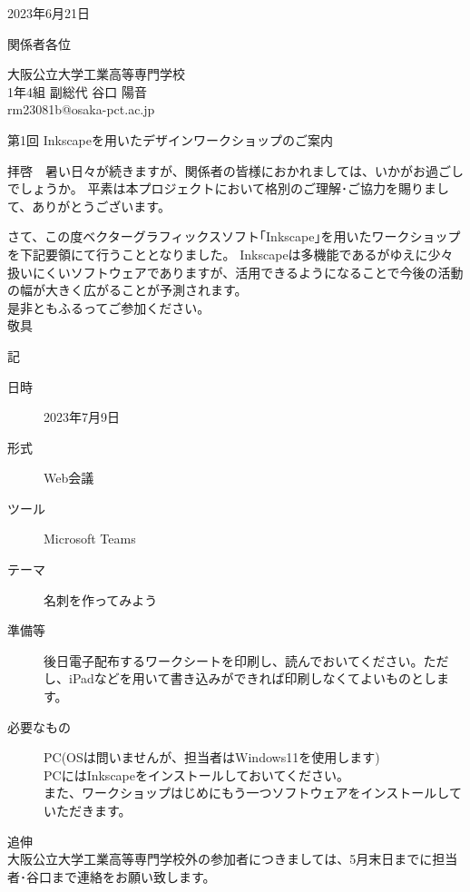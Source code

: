 \documentclass[12pt]{ltjsarticle}
\begin{document}
\begin{flushright}
  2023年6月21日
\end{flushright}

\begin{flushleft}
  関係者各位
\end{flushleft}

\begin{flushright}
  大阪公立大学工業高等専門学校\\
  1年4組 副総代 谷口 陽音\\
  rm23081b@osaka-pct.ac.jp
\end{flushright}

\begin{center}
  \Large 第1回  Inkscapeを用いたデザインワークショップのご案内
\end{center}

拝啓　暑い日々が続きますが、関係者の皆様におかれましては、いかがお過ごしでしょうか。
平素は本プロジェクトにおいて格別のご理解･ご協力を賜りまして、ありがとうございます。


さて、この度ベクターグラフィックスソフト｢Inkscape｣を用いたワークショップを下記要領にて行うこととなりました。
Inkscapeは多機能であるがゆえに少々扱いにくいソフトウェアでありますが、活用できるようになることで今後の活動の幅が大きく広がることが予測されます。\\
是非ともふるってご参加ください。\\
敬具

\begin{center}
  記
\end{center}

\begin{description}
  \item[日時] 2023年7月9日
  \item[形式] Web会議
  \item[ツール] Microsoft Teams
  \item[テーマ] 名刺を作ってみよう
  \item[準備等] 後日電子配布するワークシートを印刷し、読んでおいてください。ただし、iPadなどを用いて書き込みができれば印刷しなくてよいものとします。
  \item[必要なもの] PC(OSは問いませんが、担当者はWindows11を使用します)\\
  \textasteriskcentered PCにはInkscapeをインストールしておいてください。\\ 
  また、ワークショップはじめにもう一つソフトウェアをインストールしていただきます。
\end{description}
追伸\\
大阪公立大学工業高等専門学校外の参加者につきましては、5月末日までに担当者･谷口まで連絡をお願い致します。\\
\end{document}
